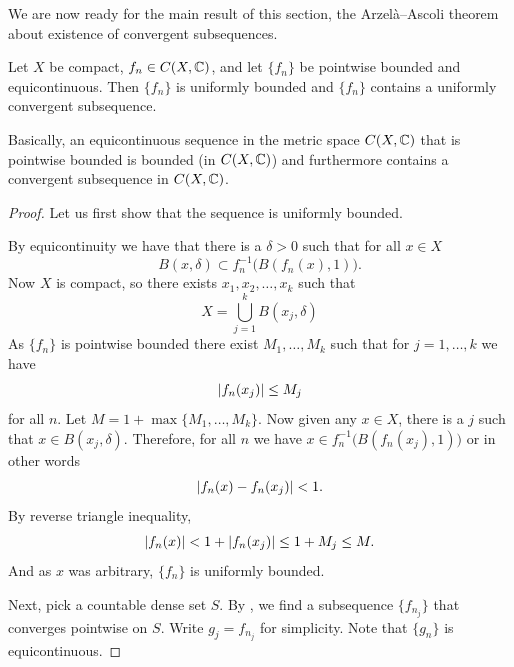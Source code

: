 We are now ready for the main result of this section,
the Arzel\`a--Ascoli theorem about existence of convergent subsequences.

\begin{thm}
Let $X$ be compact, $f_n \in C(X,{\mathbb{C}})$, and let $\{ f_n \}$
be pointwise bounded and equicontinuous.  Then
$\{f_n\}$ is uniformly bounded and $\{ f_n \}$ contains a uniformly
convergent subsequence.
\end{thm}

Basically, an equicontinuous sequence in the metric space
$C(X,{\mathbb{C}})$ that is pointwise bounded
is bounded (in $C(X,{\mathbb{C}})$) and furthermore contains a convergent
subsequence in $C(X,{\mathbb{C}})$.

\begin{proof}
Let us first show that the sequence is uniformly bounded.

By equicontinuity we have that there is a $\delta > 0$
such that for all $x \in X$
\begin{equation*}
B(x,\delta) \subset f_n^{-1}\bigl(B(f_n(x),1)\bigr) .
\end{equation*}
Now $X$ is compact, so there exists $x_1,x_2,\ldots,x_k$
such that
\begin{equation*}
X = \bigcup_{j=1}^k B(x_j,\delta)
\end{equation*}
As $\{ f_n \}$ is pointwise bounded there exist $M_1,\ldots,M_k$
such that for $j=1,\ldots,k$ we have
\begin{equation*}
\lvert {f_n(x_j)} \rvert \leq M_j
\end{equation*}
for all $n$.  Let $M = 1+ \max \{ M_1,\ldots,M_k \}$.  Now given any
$x \in X$, there is a $j$ such that $x \in B(x_j,\delta)$.  Therefore,
for all $n$ we have
$x \in f_n^{-1}\bigl(B(f_n(x_j),1)\bigr)$ or in other words
\begin{equation*}
\lvert {f_n(x)-f_n(x_j)} \rvert < 1 .
\end{equation*}
By reverse triangle inequality,
\begin{equation*}
\lvert {f_n(x)} \rvert < 1+ \lvert {f_n(x_j)} \rvert \leq 1+M_j \leq M .
\end{equation*}
And as $x$ was arbitrary, $\{f_n\}$ is uniformly bounded.


Next, pick a countable dense set $S$.  By , we find
a subsequence $\{ f_{n_j} \}$ that converges pointwise on $S$.
Write $g_j = f_{n_j}$ for simplicity.  Note that $\{ g_n \}$ is 
equicontinuous.


\end{proof}
